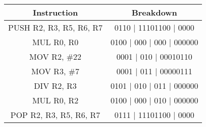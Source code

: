 \begin{tabular}{|c|c|}
    \hline
    \textbf{Instruction}    & \textbf{Breakdown}        \\
    \hline
    PUSH R2, R3, R5, R6, R7 & 0110 | 11101100 | 0000    \\
    \hline
    MUL R0, R0              & 0100 | 000 | 000 | 000000 \\
    \hline
    MOV R2, \#22            & 0001 | 010 | 00010110     \\
    \hline
    MOV R3, \#7             & 0001 | 011 | 00000111     \\
    \hline
    DIV R2, R3              & 0101 | 010 | 011 | 000000 \\
    \hline
    MUL R0, R2              & 0100 | 000 | 010 | 000000 \\
    \hline
    POP R2, R3, R5, R6, R7  & 0111 | 11101100 | 0000    \\
    \hline
\end{tabular}
